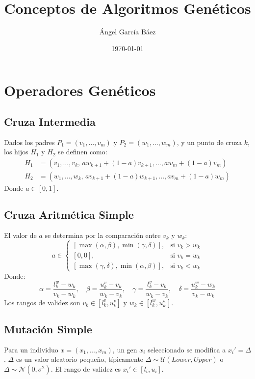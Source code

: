 \documentclass[11pt, letterpaper]{article}
\title{\bfseries Conceptos de Algoritmos Genéticos}
\author{Ángel García Báez}
\date{\today}
\begin{document}
	\maketitle
	
	\section*{Operadores Genéticos}
	
	\subsection*{Cruza Intermedia}
	Dados los padres $P_1 = (v_1, \ldots, v_m)$ y $P_2 = (w_1, \ldots, w_m)$, y un punto de cruza $k$, los hijos $H_1$ y $H_2$ se definen como:
	\begin{align*}
		H_1 &= (v_1, \ldots, v_k, \, a w_{k+1} + (1-a) v_{k+1}, \ldots, a w_m + (1-a) v_m) \\
		H_2 &= (w_1, \ldots, w_k, \, a v_{k+1} + (1-a) w_{k+1}, \ldots, a v_m + (1-a) w_m)
	\end{align*}
	Donde $a \in [0, 1]$.
	
	\subsection*{Cruza Aritmética Simple}
	El valor de $a$ se determina por la comparación entre $v_k$ y $w_k$:
	\[
	a \in
	\begin{cases}
		\left[ \max(\alpha, \beta), \min(\gamma, \delta) \right], & \text{si } v_k > w_k \\
		[0, 0], & \text{si } v_k = w_k \\
		\left[ \max(\gamma, \delta), \min(\alpha, \beta) \right], & \text{si } v_k < w_k
	\end{cases}
	\]
	Donde:
	\[
	\alpha = \frac{l_k^w - w_k}{v_k - w_k}, \quad
	\beta = \frac{u_k^v - v_k}{w_k - v_k}, \quad
	\gamma = \frac{l_k^v - v_k}{w_k - v_k}, \quad
	\delta = \frac{u_k^w - w_k}{v_k - w_k}
	\]
	Los rangos de validez son $v_k \in [l_k^v, u_k^v]$ y $w_k \in [l_k^w, u_k^w]$.
	
	\subsection*{Mutación Simple}
	Para un individuo $x = (x_1, \ldots, x_m)$, un gen $x_i$ seleccionado se modifica a $x_i' = \Delta$.
	$\Delta$ es un valor aleatorio pequeño, típicamente $\Delta \sim \mathcal{U}(Lower, Upper)$ o $\Delta \sim \mathcal{N}(0, \sigma^2)$.
	El rango de validez es $x_i' \in [l_i, u_i]$.
	
\end{document}
